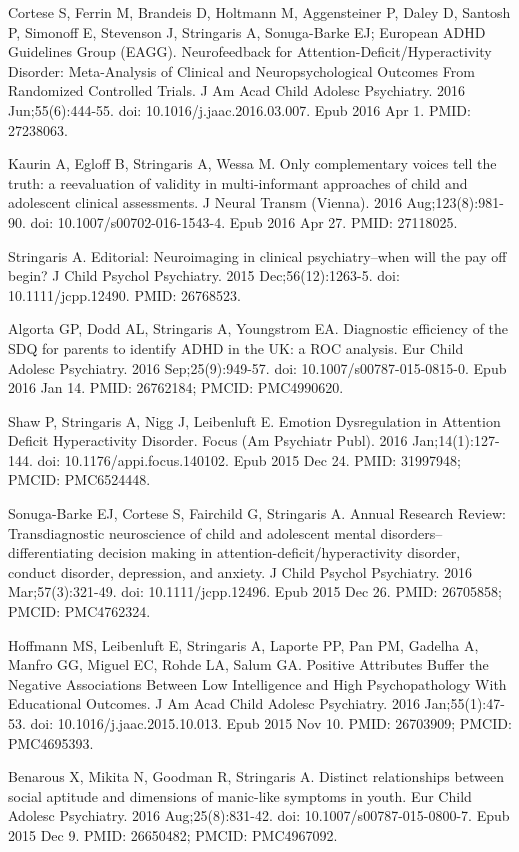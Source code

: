 \documentclass[
]{article}
\begin{document}
Cortese S, Ferrin M, Brandeis D, Holtmann M, Aggensteiner P, Daley D,
Santosh P, Simonoff E, Stevenson J, Stringaris A, Sonuga-Barke EJ;
European ADHD Guidelines Group (EAGG). Neurofeedback for
Attention-Deficit/Hyperactivity Disorder: Meta-Analysis of Clinical and
Neuropsychological Outcomes From Randomized Controlled Trials. J Am Acad
Child Adolesc Psychiatry. 2016 Jun;55(6):444-55. doi:
10.1016/j.jaac.2016.03.007. Epub 2016 Apr 1. PMID: 27238063.

Kaurin A, Egloff B, Stringaris A, Wessa M. Only complementary voices
tell the truth: a reevaluation of validity in multi-informant approaches
of child and adolescent clinical assessments. J Neural Transm (Vienna).
2016 Aug;123(8):981-90. doi: 10.1007/s00702-016-1543-4. Epub 2016 Apr
27. PMID: 27118025.

Stringaris A. Editorial: Neuroimaging in clinical psychiatry--when will
the pay off begin? J Child Psychol Psychiatry. 2015 Dec;56(12):1263-5.
doi: 10.1111/jcpp.12490. PMID: 26768523.

Algorta GP, Dodd AL, Stringaris A, Youngstrom EA. Diagnostic efficiency
of the SDQ for parents to identify ADHD in the UK: a ROC analysis. Eur
Child Adolesc Psychiatry. 2016 Sep;25(9):949-57. doi:
10.1007/s00787-015-0815-0. Epub 2016 Jan 14. PMID: 26762184; PMCID:
PMC4990620.

Shaw P, Stringaris A, Nigg J, Leibenluft E. Emotion Dysregulation in
Attention Deficit Hyperactivity Disorder. Focus (Am Psychiatr Publ).
2016 Jan;14(1):127-144. doi: 10.1176/appi.focus.140102. Epub 2015 Dec
24. PMID: 31997948; PMCID: PMC6524448.

Sonuga-Barke EJ, Cortese S, Fairchild G, Stringaris A. Annual Research
Review: Transdiagnostic neuroscience of child and adolescent mental
disorders-- differentiating decision making in
attention-deficit/hyperactivity disorder, conduct disorder, depression,
and anxiety. J Child Psychol Psychiatry. 2016 Mar;57(3):321-49. doi:
10.1111/jcpp.12496. Epub 2015 Dec 26. PMID: 26705858; PMCID: PMC4762324.

Hoffmann MS, Leibenluft E, Stringaris A, Laporte PP, Pan PM, Gadelha A,
Manfro GG, Miguel EC, Rohde LA, Salum GA. Positive Attributes Buffer the
Negative Associations Between Low Intelligence and High Psychopathology
With Educational Outcomes. J Am Acad Child Adolesc Psychiatry. 2016
Jan;55(1):47-53. doi: 10.1016/j.jaac.2015.10.013. Epub 2015 Nov 10.
PMID: 26703909; PMCID: PMC4695393.

Benarous X, Mikita N, Goodman R, Stringaris A. Distinct relationships
between social aptitude and dimensions of manic-like symptoms in youth.
Eur Child Adolesc Psychiatry. 2016 Aug;25(8):831-42. doi:
10.1007/s00787-015-0800-7. Epub 2015 Dec 9. PMID: 26650482; PMCID:
PMC4967092.
\end{document}
